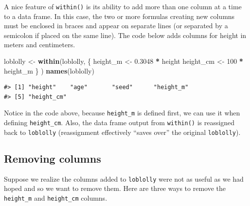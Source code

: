 \documentclass[
  11pt,
]{krantz}
\newenvironment{Shaded}{\begin{snugshade}}{\end{snugshade}}
\newcommand{\DecValTok}[1]{\textcolor[rgb]{0.00,0.00,0.81}{#1}}
\newcommand{\FloatTok}[1]{\textcolor[rgb]{0.00,0.00,0.81}{#1}}
\newcommand{\KeywordTok}[1]{\textcolor[rgb]{0.13,0.29,0.53}{\textbf{#1}}}
\newcommand{\NormalTok}[1]{#1}
\newcommand{\OperatorTok}[1]{\textcolor[rgb]{0.81,0.36,0.00}{\textbf{#1}}}
\newcommand{\StringTok}[1]{\textcolor[rgb]{0.31,0.60,0.02}{#1}}
\theoremstyle{definition}
\theoremstyle{definition}
\theoremstyle{definition}
\theoremstyle{definition}
\theoremstyle{remark}
\begin{document}
A nice feature of \texttt{within()} is its ability to add more than one column at a time to a data frame. In this case, the two or more formulas creating new columns must be enclosed in braces and appear on separate lines (or separated by a semicolon if placed on the same line). The code below adds columns for height in meters and centimeters.

\begin{Shaded}
\begin{Highlighting}[]
\NormalTok{loblolly \textless{}{-}}\StringTok{ }\KeywordTok{within}\NormalTok{(loblolly, \{}
\NormalTok{                              height\_m \textless{}{-}}\StringTok{ }\FloatTok{0.3048} \OperatorTok{*}\StringTok{ }\NormalTok{height }
\NormalTok{                              height\_cm \textless{}{-}}\StringTok{ }\DecValTok{100} \OperatorTok{*}\StringTok{ }\NormalTok{height\_m}
\NormalTok{                              \}}
\NormalTok{                   )}
\KeywordTok{names}\NormalTok{(loblolly)}
\end{Highlighting}
\end{Shaded}

\begin{verbatim}
#> [1] "height"    "age"       "seed"      "height_m" 
#> [5] "height_cm"
\end{verbatim}

Notice in the code above, because \texttt{height\_m} is defined first, we can use it when defining \texttt{height\_cm}. Also, the data frame output from \texttt{within()} is reassigned back to \texttt{loblolly} (reassignment effectively ``saves over'' the original \texttt{loblolly}).

\hypertarget{removing-columns}{%
\subsection{Removing columns}\label{removing-columns}}

Suppose we realize the columns added to \texttt{loblolly} were not as useful as we had hoped and so we want to remove them. Here are three ways to remove the \texttt{height\_m} and \texttt{height\_cm} columns.
\end{document}
